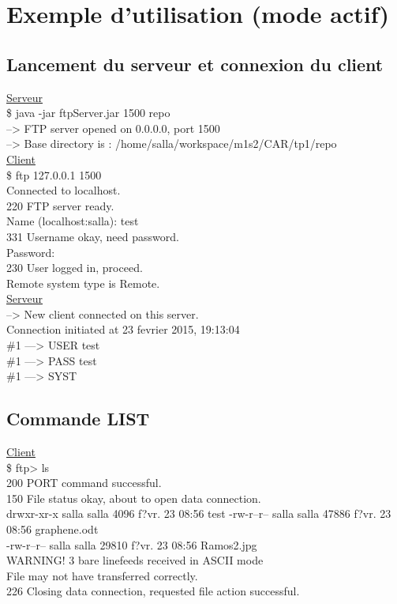 \section*{Exemple d'utilisation (mode actif)}
\subsection*{Lancement du serveur et connexion du client}

\underline{Serveur}\\
\$ java -jar ftpServer.jar 1500 repo \\
--> FTP server opened on 0.0.0.0, port 1500\\
--> Base directory is : /home/salla/workspace/m1s2/CAR/tp1/repo\\

\underline{Client}\\
\$ ftp 127.0.0.1 1500\\
Connected to localhost.\\
220 FTP server ready.\\
Name (localhost:salla): test\\
331 Username okay, need password.\\
Password:\\
230 User logged in, proceed.\\
Remote system type is Remote.\\

\underline{Serveur}\\
--> New client connected on this server.\\
Connection initiated at 23 fevrier 2015, 19:13:04\\
\#1 ---> USER test\\
\#1 ---> PASS test\\
\#1 ---> SYST

\subsection*{Commande LIST}

\underline{Client}\\
\$ ftp> ls\\
200 PORT command successful.\\
150 File status okay, about to open data connection.\\
drwxr-xr-x salla salla   4096 f?vr. 23 08:56 test
-rw-r--r-- salla salla  47886 f?vr. 23 08:56 graphene.odt\\
-rw-r--r-- salla salla  29810 f?vr. 23 08:56 Ramos2.jpg\\
WARNING! 3 bare linefeeds received in ASCII mode\\
File may not have transferred correctly.\\
226 Closing data connection, requested file action successful.\\

